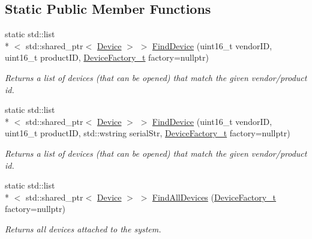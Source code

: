 \subsection*{Static Public Member Functions}
\begin{DoxyCompactItemize}
\item 
static std\-::list\\*
$<$ std\-::shared\-\_\-ptr$<$ \hyperlink{class_lib_u_s_b_1_1_device}{Device} $>$ $>$ \hyperlink{class_lib_u_s_b_1_1_lib_u_s_b_a1e96edfe8903783e33d572ff43ee8238}{Find\-Device} (uint16\-\_\-t vendor\-I\-D, uint16\-\_\-t product\-I\-D, \hyperlink{class_lib_u_s_b_1_1_lib_u_s_b_a532d474d390477dffd2109e8540be558}{Device\-Factory\-\_\-t} factory=nullptr)
\begin{DoxyCompactList}\small\item\em Returns a list of devices (that can be opened) that match the given vendor/product id. \end{DoxyCompactList}\item 
static std\-::list\\*
$<$ std\-::shared\-\_\-ptr$<$ \hyperlink{class_lib_u_s_b_1_1_device}{Device} $>$ $>$ \hyperlink{class_lib_u_s_b_1_1_lib_u_s_b_aaf1f6d3a7df3a9fefd8b12ba25a7c3be}{Find\-Device} (uint16\-\_\-t vendor\-I\-D, uint16\-\_\-t product\-I\-D, std\-::wstring serial\-Str, \hyperlink{class_lib_u_s_b_1_1_lib_u_s_b_a532d474d390477dffd2109e8540be558}{Device\-Factory\-\_\-t} factory=nullptr)
\begin{DoxyCompactList}\small\item\em Returns a list of devices (that can be opened) that match the given vendor/product id. \end{DoxyCompactList}\item 
\hypertarget{class_lib_u_s_b_1_1_lib_u_s_b_acce20c7a3bd52fffe9df3ce23021858d}{static std\-::list\\*
$<$ std\-::shared\-\_\-ptr$<$ \hyperlink{class_lib_u_s_b_1_1_device}{Device} $>$ $>$ \hyperlink{class_lib_u_s_b_1_1_lib_u_s_b_acce20c7a3bd52fffe9df3ce23021858d}{Find\-All\-Devices} (\hyperlink{class_lib_u_s_b_1_1_lib_u_s_b_a532d474d390477dffd2109e8540be558}{Device\-Factory\-\_\-t} factory=nullptr)}\label{class_lib_u_s_b_1_1_lib_u_s_b_acce20c7a3bd52fffe9df3ce23021858d}

\begin{DoxyCompactList}\small\item\em Returns all devices attached to the system. \end{DoxyCompactList}\end{DoxyCompactItemize}
